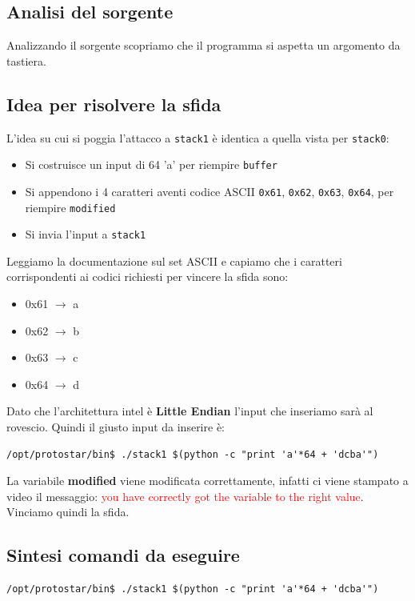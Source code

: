 \subsection{Analisi del sorgente}
Analizzando il sorgente scopriamo che il programma si aspetta un argomento da tastiera.

\subsection{Idea per risolvere la sfida}
L'idea su cui si poggia l'attacco a \texttt{stack1} è identica a quella vista per \texttt{stack0}:
\begin{itemize}
    \item Si costruisce un input di 64 'a' per riempire \texttt{buffer}
    \item Si appendono i 4 caratteri aventi codice ASCII \texttt{0x61}, \texttt{0x62}, \texttt{0x63}, \texttt{0x64}, per riempire \texttt{modified}
    \item Si invia l'input a \texttt{stack1}
\end{itemize}

Leggiamo la documentazione sul set ASCII e capiamo che i caratteri corrispondenti ai codici richiesti per vincere la sfida sono:
\begin{itemize}
    \item 0x61 $\rightarrow$ a
    \item 0x62 $\rightarrow$ b
    \item 0x63 $\rightarrow$ c
    \item 0x64 $\rightarrow$ d
\end{itemize}

Dato che l'architettura intel è \textbf{Little Endian} l'input che inseriamo sarà al rovescio. Quindi il giusto input da inserire è:
\begin{lstlisting}[style=bashstyle]
    /opt/protostar/bin$ ./stack1 $(python -c "print 'a'*64 + 'dcba'")
\end{lstlisting}
La variabile \textbf{modified} viene modificata correttamente, infatti ci viene stampato a video il messaggio: \textcolor{red}{you have correctly got the variable to the right value}. Vinciamo quindi la sfida.

\subsection{Sintesi comandi da eseguire}
\begin{lstlisting}[style=bashstyle]
    /opt/protostar/bin$ ./stack1 $(python -c "print 'a'*64 + 'dcba'")
\end{lstlisting}

